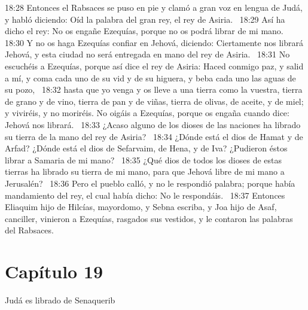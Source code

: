18:28 Entonces el Rabsaces se puso en pie y clamó a gran voz en lengua de Judá, y habló diciendo: Oíd la palabra del gran rey, el rey de Asiria.  
18:29 Así ha dicho el rey: No os engañe Ezequías, porque no os podrá librar de mi mano.  
18:30 Y no os haga Ezequías confiar en Jehová, diciendo: Ciertamente nos librará Jehová, y esta ciudad no será entregada en mano del rey de Asiria.  
18:31 No escuchéis a Ezequías, porque así dice el rey de Asiria: Haced conmigo paz, y salid a mí, y coma cada uno de su vid y de su higuera, y beba cada uno las aguas de su pozo,  
18:32 hasta que yo venga y os lleve a una tierra como la vuestra, tierra de grano y de vino, tierra de pan y de viñas, tierra de olivas, de aceite, y de miel; y viviréis, y no moriréis. No oigáis a Ezequías, porque os engaña cuando dice: Jehová nos librará.  
18:33 ¿Acaso alguno de los dioses de las naciones ha librado su tierra de la mano del rey de Asiria?  
18:34 ¿Dónde está el dios de Hamat y de Arfad? ¿Dónde está el dios de Sefarvaim, de Hena, y de Iva? ¿Pudieron éstos librar a Samaria de mi mano?  
18:35 ¿Qué dios de todos los dioses de estas tierras ha librado su tierra de mi mano, para que Jehová libre de mi mano a Jerusalén?  
18:36 Pero el pueblo calló, y no le respondió palabra; porque había mandamiento del rey, el cual había dicho: No le respondáis.  
18:37 Entonces Eliaquim hijo de Hilcías, mayordomo, y Sebna escriba, y Joa hijo de Asaf, canciller, vinieron a Ezequías, rasgados sus vestidos, y le contaron las palabras del Rabsaces.  
\section*{Capítulo 19}
Judá es librado de Senaquerib   

